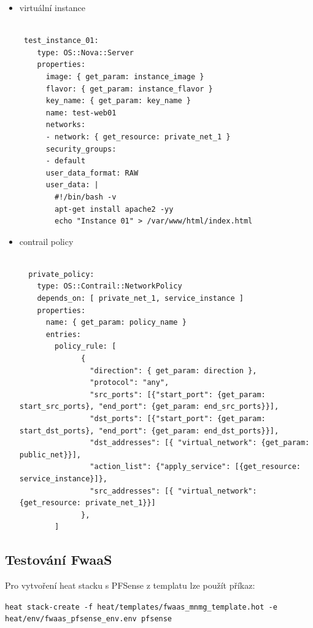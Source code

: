 \begin{itemize}
\item virtuální instance
\begin{lstlisting}[caption=Virtuální instance pro testování]

 test_instance_01:
    type: OS::Nova::Server
    properties:
      image: { get_param: instance_image }
      flavor: { get_param: instance_flavor }
      key_name: { get_param: key_name }
      name: test-web01
      networks:
      - network: { get_resource: private_net_1 }
      security_groups:
      - default
      user_data_format: RAW
      user_data: |
        #!/bin/bash -v
        apt-get install apache2 -yy
        echo "Instance 01" > /var/www/html/index.html

\end{lstlisting}

\item contrail policy

\begin{lstlisting}[caption=Contrail network policy]

  private_policy:
    type: OS::Contrail::NetworkPolicy
    depends_on: [ private_net_1, service_instance ]
    properties:
      name: { get_param: policy_name }
      entries:
        policy_rule: [
              { 
                "direction": { get_param: direction }, 
                "protocol": "any", 
                "src_ports": [{"start_port": {get_param: start_src_ports}, "end_port": {get_param: end_src_ports}}],
                "dst_ports": [{"start_port": {get_param: start_dst_ports}, "end_port": {get_param: end_dst_ports}}],
                "dst_addresses": [{ "virtual_network": {get_param: public_net}}], 
                "action_list": {"apply_service": [{get_resource: service_instance}]}, 
                "src_addresses": [{ "virtual_network": {get_resource: private_net_1}}] 
              }, 
        ]

\end{lstlisting}
\end{itemize}






\subsection{Testování FwaaS}\label{sub:interaction}

Pro vytvoření heat stacku s PFSense z templatu lze použít příkaz:

\verb!heat stack-create -f heat/templates/fwaas_mnmg_template.hot -e heat/env/fwaas_pfsense_env.env pfsense!


